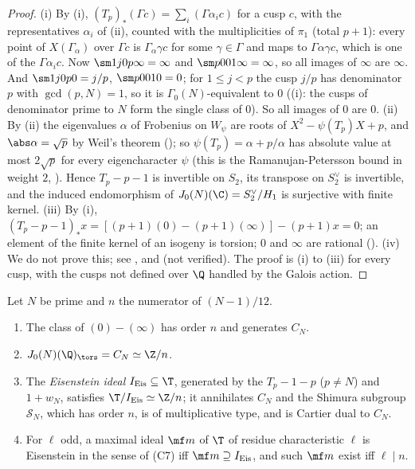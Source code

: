 \begin{proof}
(i) By (i), $(T_p)_*(\Gamma c)=\sum_i(\Gamma\alpha_ic)$ for a cusp $c$, with the representatives $\alpha_i$ of (ii), counted with the
multiplicities of $\pi_1$ (total $p+1$): every point of $X(\Gamma_\alpha)$ over $\Gamma c$ is $\Gamma_\alpha\gamma c$ for some $\gamma\in\Gamma$ and maps to $\Gamma\alpha\gamma c$, which is one of the $\Gamma\alpha_ic$. Now
$\sm1j0p\infty=\infty$ and $\sm p001\infty=\infty$, so all images of $\infty$ are $\infty$. And $\sm1j0p0=j/p$, $\sm p001 0=0$; for $1\le j<p$ the cusp $j/p$ has denominator $p$ with
$\gcd(p,N)=1$, so it is $\Gamma_0(N)$-equivalent to $0$ ((i): the cusps of denominator prime to $N$ form the single class of $0$). So all images of $0$ are $0$.
(ii) By (ii) the eigenvalues $\alpha$ of Frobenius on $W_\psi$ are roots of $X^2-\psi(T_p)X+p$, and $\abs\alpha=\sqrt p$ by Weil's theorem (); so
$\psi(T_p)=\alpha+p/\alpha$ has absolute value at most $2\sqrt p$ for every eigencharacter $\psi$ (this is the Ramanujan-Petersson bound in weight $2$, ). Hence $T_p-p-1$ is
invertible on $S_2$, its transpose on $S_2^\vee$ is invertible, and the induced endomorphism of $J_0(N)(\C)=S_2^\vee/H_1$ is surjective with finite kernel.
(iii) By (i), $(T_p-p-1)_*x=[(p+1)(0)-(p+1)(\infty)]-(p+1)x=0$; an element of the finite kernel of an isogeny is torsion; $0$ and $\infty$ are rational ().
(iv) We do not prove this; see \cite[Chapter II]{Mazur77}, \cite[Section 6.6]{Stein} and \cite{Ogg73} (not verified). The proof is (i) to (iii) for every cusp, with the cusps not defined over
$\Q$ handled by the Galois action.
\end{proof}

\begin{theorem}\label{thm:moddeg:mazur-prime-level}
Let $N$ be prime and $n$ the numerator of $(N-1)/12$.
\begin{enumerate}[label=(\roman*)]
\item The class of $(0)-(\infty)$ has order $n$ and generates $C_N$.
\item $J_0(N)(\Q)_{\tors}=C_N\simeq\Z/n$.
\item The \emph{Eisenstein ideal} $I_{\mathrm{Eis}}\subseteq\T$, generated by the $T_p-1-p$ ($p\ne N$) and $1+w_N$, satisfies $\T/I_{\mathrm{Eis}}\simeq\Z/n$; it annihilates $C_N$ and the Shimura subgroup $\mathcal S_N$,
which has order $n$, is of multiplicative type, and is Cartier dual to $C_N$.
\item For $\ell$ odd, a maximal ideal $\mf m$ of $\T$ of residue characteristic $\ell$ is Eisenstein in the sense of (C7) iff $\mf m\supseteq I_{\mathrm{Eis}}$, and such $\mf m$ exist iff $\ell\mid n$.
\end{enumerate}
\end{theorem}

